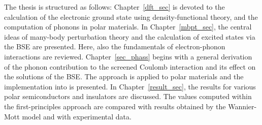 The thesis is structured as follows: Chapter~\ref{dft_sec} is devoted to the calculation of the electronic ground state using density-functional theory, and the computation of phonons in polar materials. In Chapter~\ref{mbpt_sec}, the central ideas of many-body perturbation theory  and the calculation of excited states via the BSE are presented. Here, also the fundamentals of electron-phonon interactions are reviewed. Chapter~\ref{sec_phass}  begins with a general derivation of the phonon contribution to the screened Coulomb interaction  and its effect on the solutions of the BSE. The approach is applied to  polar materials and the implementation into \exciting{} is presented. In  Chapter~\ref{result_sec}, the results for various polar semiconductors and insulators are discussed. The values computed  within the first-principles approach are compared with results obtained by the Wannier-Mott model and with experimental data.
